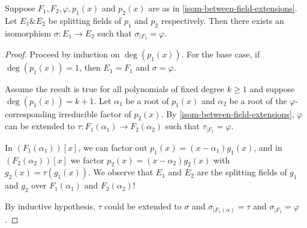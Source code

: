 \documentclass[12pt]{article}
\begin{document}
\begin{proposition}
    Suppose $F_1,F_2,\varphi,p_1(x)$ and $p_2(x)$ are as in \cref{isom-between-field-extensions}. Let $E_1\& E_2$ be splitting fields of $p_1$ and $p_2$ respectively. Then there exists an isomorphism $\sigma: E_1\to E_2$ such that $\sigma_{|F_1}=\varphi$.

    \begin{proof}
        Proceed by induction on $\deg(p_1(x))$. For the base case, if $\deg(p_1(x))=1$, then $E_1=F_1$ and $\sigma=\varphi$.

        Assume the result is true for all polynomials of fixed degree $k\geq 1$ and suppose $\deg(p_1(x))=k+1$. Let $\alpha_1$ be a root of $p_1(x)$ and $\alpha_2$ be a root of the $\varphi$-corresponding irreducible factor of $p_2(x)$. By \cref{isom-between-field-extensions}, $\varphi$ can be extended to $\tau: F_1(\alpha_1)\to F_2(\alpha_2)$ such that $\tau_{|F_1}=\varphi$.
        
        In $(F_1(\alpha_1))[x]$, we can factor out $p_1(x)=(x-\alpha_1)g_1(x)$, and in $(F_2(\alpha_2))[x]$ we factor $p_2(x)=(x-\alpha_2)g_2(x)$ with $g_2(x)=\tau(g_1(x))$. We observe that $E_1$ and $E_2$ are the splitting fields of $g_1$ and $g_2$ over $F_1(\alpha_1)$ and $F_2(\alpha_2)$!

        By inductive hypothesis, $\tau$ could be extended to $\sigma$ and $\sigma_{|F_1(\alpha)}=\tau$ and $\sigma_{|F_1}=\varphi$.
    \end{proof}
\end{proposition}
\end{document}
